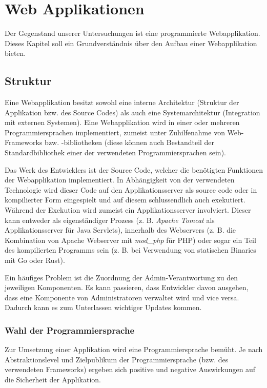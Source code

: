 \chapter{Web Applikationen}

Der Gegenstand unserer Untersuchungen ist eine programmierte Webapplikation. Dieses Kapitel soll ein Grundverständnis über den Aufbau einer Webapplikation bieten.

\section{Struktur}

Eine Webapplikation besitzt sowohl eine interne Architektur (Struktur der Applikation bzw. des Source Codes) als auch eine Systemarchitektur (Integration mit externen Systemen). Eine Webapplikation wird in einer oder mehreren Programmiersprachen implementiert, zumeist unter Zuhilfenahme von Web-Frameworks bzw. -bibliotheken (diese können auch Bestandteil der Standardbibliothek einer der verwendeten Programmiersprachen sein).

Das Werk des Entwicklers ist der Source Code, welcher die benötigten Funktionen der Webapplikation implementiert. In Abhängigkeit von der verwendeten Technologie wird dieser Code auf den Applikationsserver als source code oder in kompilierter Form eingespielt und auf diesem schlussendlich auch exekutiert. Während der Exekution wird zumeist ein Applikationsserver involviert. Dieser kann entweder als eigenständiger Prozess (z. B. \textit{Apache Tomcat} als Applikationsserver für Java Servlets), innerhalb des Webservers (z. B. die Kombination von Apache Webserver mit \textit{mod\_php} für PHP) oder sogar ein Teil des kompilierten Programms sein (z. B. bei Verwendung von statischen Binaries mit Go oder Rust).

Ein häufiges Problem ist die Zuordnung der Admin-Verantwortung zu den jeweiligen Komponenten. Es kann passieren, dass Entwickler davon ausgehen, dass eine Komponente von Administratoren verwaltet wird und vice versa. Dadurch kann es zum Unterlassen wichtiger Updates kommen.

\subsection{Wahl der Programmiersprache}

Zur Umsetzung einer Applikation wird eine Programmiersprache bemüht. Je nach Abstraktionslevel und Zielpublikum der Programmiersprache (bzw. des verwendeten Frameworks) ergeben sich positive und negative Auswirkungen auf die Sicherheit der Applikation.

